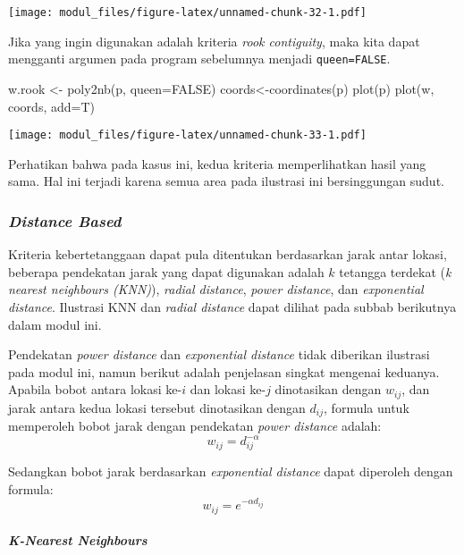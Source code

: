 \documentclass[
]{book}
\newenvironment{Shaded}{\begin{snugshade}}{\end{snugshade}}
\newcommand{\AttributeTok}[1]{\textcolor[rgb]{0.77,0.63,0.00}{#1}}
\newcommand{\ConstantTok}[1]{\textcolor[rgb]{0.00,0.00,0.00}{#1}}
\newcommand{\FunctionTok}[1]{\textcolor[rgb]{0.00,0.00,0.00}{#1}}
\newcommand{\NormalTok}[1]{#1}
\newcommand{\OtherTok}[1]{\textcolor[rgb]{0.56,0.35,0.01}{#1}}
\begin{document}
\texttt{[image: modul\_files/figure-latex/unnamed-chunk-32-1.pdf]}

Jika yang ingin digunakan adalah kriteria \emph{rook contiguity}, maka kita dapat mengganti argumen pada program sebelumnya menjadi \texttt{queen=FALSE}.

\begin{Shaded}
\begin{Highlighting}[]
\NormalTok{w.rook }\OtherTok{\textless{}{-}} \FunctionTok{poly2nb}\NormalTok{(p, }\AttributeTok{queen=}\ConstantTok{FALSE}\NormalTok{)}
\NormalTok{coords}\OtherTok{\textless{}{-}}\FunctionTok{coordinates}\NormalTok{(p)}
\FunctionTok{plot}\NormalTok{(p)}
\FunctionTok{plot}\NormalTok{(w, coords, }\AttributeTok{add=}\NormalTok{T)}
\end{Highlighting}
\end{Shaded}

\texttt{[image: modul\_files/figure-latex/unnamed-chunk-33-1.pdf]}

Perhatikan bahwa pada kasus ini, kedua kriteria memperlihatkan hasil yang sama. Hal ini terjadi karena semua area pada ilustrasi ini bersinggungan sudut.

\hypertarget{distance-based}{%
\subsubsection{\texorpdfstring{\emph{Distance Based}}{Distance Based}}\label{distance-based}}

Kriteria kebertetanggaan dapat pula ditentukan berdasarkan jarak antar lokasi, beberapa pendekatan jarak yang dapat digunakan adalah \(k\) tetangga terdekat (\emph{k nearest neighbours (KNN)}), \emph{radial distance}, \emph{power distance}, dan \emph{exponential distance}. Ilustrasi KNN dan \emph{radial distance} dapat dilihat pada subbab berikutnya dalam modul ini.

Pendekatan \emph{power distance} dan \emph{exponential distance} tidak diberikan ilustrasi pada modul ini, namun berikut adalah penjelasan singkat mengenai keduanya. Apabila bobot antara lokasi ke-\(i\) dan lokasi ke-\(j\) dinotasikan dengan \(w_{ij}\), dan jarak antara kedua lokasi tersebut dinotasikan dengan \(d_{ij}\), formula untuk memperoleh bobot jarak dengan pendekatan \emph{power distance} adalah:
\[
w_{ij}=d_{ij}^{-\alpha}
\]

Sedangkan bobot jarak berdasarkan \emph{exponential distance} dapat diperoleh dengan formula:
\[
w_{ij}=e^{{-\alpha}d_{ij}}
\]

\hypertarget{k-nearest-neighbours}{%
\paragraph{\texorpdfstring{\emph{K-Nearest Neighbours}}{K-Nearest Neighbours}}\label{k-nearest-neighbours}}
\end{document}
